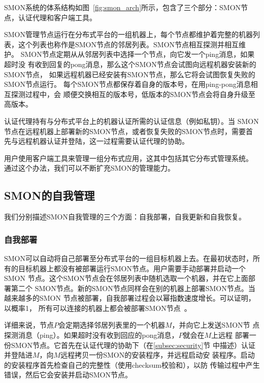SMON系统的体系结构如图~\ref{fig:smon_arch}所示，包含了三个部分：SMON节
点，认证代理和客户端工具。

SMON管理节点运行在分布式平台的一组机器上，每个节点都维护着完整的机器列
表，这个列表也称作是SMON节点的邻居列表。SMON节点相互探测并相互维护。
SMON节点定期从从邻居列表中选择一个节点，向它发一个ping消息，如果超时没
有收到回复的pong消息，那么这个SMON节点会试图向远程机器安装新的SMON节点，
如果远程机器已经安装有SMON节点，那么它将会试图恢复失败的SMON节点运行。
每个SMON节点都保存着自身的版本号，在用ping-pong消息相互探测过程中，会
顺便交换相互的版本号，低版本的SMON节点会将自身升级至高版本。

认证代理持有与分布式平台上的机器认证所需的认证信息（例如私钥）。当
SMON节点在远程机器上部署新的SMON节点，或者恢复失败的SMON节点时，需要首
先与远程机器认证并登陆，这一过程需要认证代理的协助。

用户使用客户端工具来管理一组分布式应用，这其中包括其它分布式管理系统。
通过这个办法，我们可以不断扩充SMON的管理能力。

\subsection{SMON的自我管理}

我们分别描述SMON自我管理的三个方面：自我部署，自我更新和自我恢复。

\subsubsection*{自我部署}


SMON可以自动将自己部署至分布式平台的一组目标机器上去。在最初状态时，所
有的目标机器上都没有被部署运行SMON节点。用户需要手动部署并启动一个SMON
节点。这个SMON节点会在邻居列表中随机选取一个机器，并在它上面部署第二个
SMON节点。新的SMON节点同样会在别的机器上部署SMON节点。当越来越多的SMON
节点被部署，自我部署过程会以幂指数速度增长。可以证明，以概率1，
所有可以连接的机器上都会被部署SMON节点~\cite{Eugster2004}。

详细来说，节点$P$会定期选择邻居列表里的一个机器$M$，并向它上发送SMON节
点探测消息（ping）。如果超时没有收到回应的pong消息，$P$就会在$M$上远程
部署一份SMON节点。它首先在认证代理的协助下（在\ref{subsec:security}节
中描述）认证并登陆进$M$，向$M$远程拷贝一份SMON的安装程序，并远程启动安
装程序。启动的安装程序首先检查自己的完整性（使用checksum校验和），以防
传输过程中产生错误，然后它会安装并启动SMON节点。

